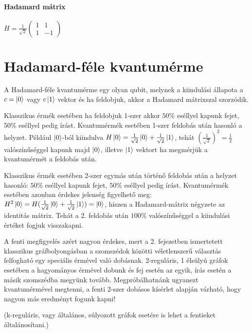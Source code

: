 \paragraph{Hadamard mátrix}

\begin{center}
  $H = \frac{1}{\sqrt{2}}\begin{pmatrix}
      1 & 1  \\
      1 & -1
    \end{pmatrix}$
\end{center}

\section{\textbf{Hadamard-féle kvantumérme}}

A Hadamard-féle kvantumérme egy olyan qubit, melynek a kiindulási állapota a $c
  = \ket{0}$ vagy $c \ket{1}$ vektor és ha feldobjuk, akkor a Hadamard mátrixszal
szorzódik.

Klasszikus érmék esetében ha feldobjuk 1-szer akkor $50\%$ eséllyel kapunk
fejet, $50\%$ eséllyel pedig írást. Kvantumérmék esetében 1-szer feldobás után
hasonló a helyzet. Például $\ket{0}$-ból kiindulva $H\ket{0} =
  \frac{1}{\sqrt{2}}\ket{0} + \frac{1}{\sqrt{2}}\ket{1}$, tehát
$(\frac{1}{\sqrt{2}})^2 = \frac{1}{2}$ valószínűséggel kapunk majd $\ket{0}$,
illetve $\ket{1}$ vektort ha megmérjük a kvantumérmét a feldobás után.

Klasszikus érmék esetében 2-szer egymás után történő feldobás után a helyzet
hasonló: $50\%$ eséllyel kapunk fejet, $50\%$ eséllyel pedig írást.
Kvantumérmék esetében azonban érdekes jelenség figyelhető meg: $H^2\ket{0} =
  H(\frac{1}{\sqrt{2}}\ket{0} + \frac{1}{\sqrt{2}}\ket{1}) = \ket{0}$, hiszen a
Hadamard-mátrix négyzete az identitás mátrix. Tehát a 2. feldobás után $100\%$
valószínűséggel a kiindulási értéket fogjuk visszakapni.

A fenti megfigyelés azért nagyon érdekes, mert a 2. fejezetben ismertetett
klasszikus gráfbolyongásban a szomszédok közötti véletlenszerű választás
felfogható egy speciális érmével való dobásnak. 2-reguláris, 1 élsúlyú gráfok
esetében a hagyományos érmével dobunk és fej esetén az egyik, írás esetén a
másik szomszédba megyünk tovább. Megpróbálhatnánk ugyanezt kvantumérmével
megtenni, a fenti 2-szer dobásos kísérlet alapján várható, hogy nagyon más
eredményt fogunk kapni!

(k-reguláris, vagy általános, súlyozott gráfok esetére is lehet a fentieket
általánosítani.)

